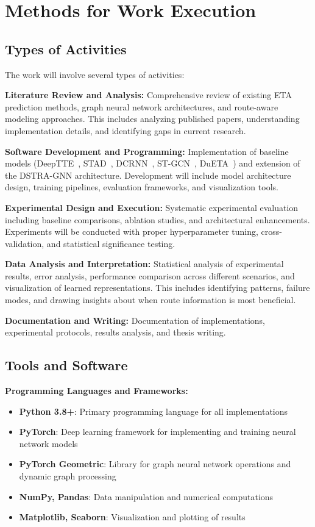 \section{Methods for Work Execution}

\subsection{Types of Activities}

The work will involve several types of activities:

\textbf{Literature Review and Analysis:} Comprehensive review of existing ETA prediction methods, graph neural network architectures, and route-aware modeling approaches. This includes analyzing published papers, understanding implementation details, and identifying gaps in current research.

\textbf{Software Development and Programming:} Implementation of baseline models (DeepTTE~\cite{deepTTE2018}, STAD~\cite{abbar2020stad}, DCRNN~\cite{dcrnn2018}, ST-GCN~\cite{yu2018stgcn}, DuETA~\cite{dueta2023}) and extension of the DSTRA-GNN architecture. Development will include model architecture design, training pipelines, evaluation frameworks, and visualization tools.

\textbf{Experimental Design and Execution:} Systematic experimental evaluation including baseline comparisons, ablation studies, and architectural enhancements. Experiments will be conducted with proper hyperparameter tuning, cross-validation, and statistical significance testing.

\textbf{Data Analysis and Interpretation:} Statistical analysis of experimental results, error analysis, performance comparison across different scenarios, and visualization of learned representations. This includes identifying patterns, failure modes, and drawing insights about when route information is most beneficial.

\textbf{Documentation and Writing:} Documentation of implementations, experimental protocols, results analysis, and thesis writing.

\subsection{Tools and Software}

\textbf{Programming Languages and Frameworks:}
\begin{itemize}
    \item \textbf{Python 3.8+}: Primary programming language for all implementations
    \item \textbf{PyTorch}: Deep learning framework for implementing and training neural network models
    \item \textbf{PyTorch Geometric}: Library for graph neural network operations and dynamic graph processing
    \item \textbf{NumPy, Pandas}: Data manipulation and numerical computations
    \item \textbf{Matplotlib, Seaborn}: Visualization and plotting of results
\end{itemize}

